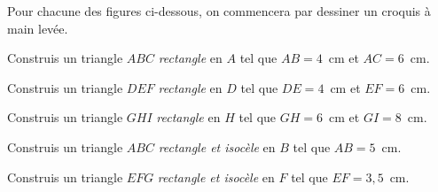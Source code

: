 \par Pour chacune des figures ci-dessous, on commencera par dessiner un croquis à main levée.
\begin{myenumerate}
\item Construis un triangle $ABC$ {\em rectangle} en $A$ tel que $AB=4$~cm et $AC=6$~cm.
\item Construis un triangle $DEF$ {\em rectangle} en $D$ tel que $DE=4$~cm et $EF=6$~cm.
\item Construis un triangle $GHI$ {\em rectangle} en $H$ tel que $GH=6$~cm et $GI=8$~cm.
\item Construis un triangle $ABC$ {\em rectangle et isocèle} en $B$ tel que $AB=5$~cm.
\item Construis un triangle $EFG$ {\em rectangle et isocèle} en $F$ tel que $EF=3,5$~cm.
\end{myenumerate}